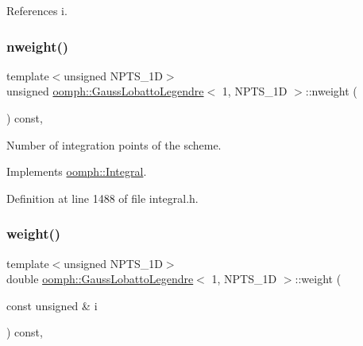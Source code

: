 References i.

\mbox{\label{classoomph_1_1GaussLobattoLegendre_3_011_00_01NPTS__1D_01_4_a717e3061c41c615075bf7934ddd39167}} 
\subsubsection{\texorpdfstring{nweight()}{nweight()}}
{\footnotesize\ttfamily template$<$unsigned N\+P\+T\+S\+\_\+1D$>$ \\
unsigned \hyperlink{classoomph_1_1GaussLobattoLegendre}{oomph\+::\+Gauss\+Lobatto\+Legendre}$<$ 1, N\+P\+T\+S\+\_\+1D $>$\+::nweight (\begin{DoxyParamCaption}{ }\end{DoxyParamCaption}) const\hspace{0.3cm}{\ttfamily [inline]}, {\ttfamily [virtual]}}



Number of integration points of the scheme. 



Implements \hyperlink{classoomph_1_1Integral_a1a270de9d99a1fcf1d25a6c1017f65fa}{oomph\+::\+Integral}.



Definition at line 1488 of file integral.\+h.

\mbox{\label{classoomph_1_1GaussLobattoLegendre_3_011_00_01NPTS__1D_01_4_a234219d47fb942b9870a0663e2dda007}} 
\subsubsection{\texorpdfstring{weight()}{weight()}}
{\footnotesize\ttfamily template$<$unsigned N\+P\+T\+S\+\_\+1D$>$ \\
double \hyperlink{classoomph_1_1GaussLobattoLegendre}{oomph\+::\+Gauss\+Lobatto\+Legendre}$<$ 1, N\+P\+T\+S\+\_\+1D $>$\+::weight (\begin{DoxyParamCaption}\item[{const unsigned \&}]{i }\end{DoxyParamCaption}) const\hspace{0.3cm}{\ttfamily [inline]}, {\ttfamily [virtual]}}



